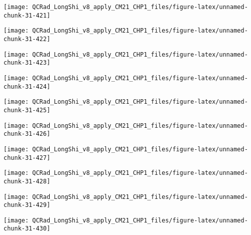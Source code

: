 \documentclass[
  10pt,
  a4paper,oneside]{article}
\begin{document}
\begin{center}\texttt{[image: QCRad\_LongShi\_v8\_apply\_CM21\_CHP1\_files/figure-latex/unnamed-chunk-31-421]} \end{center}

\begin{center}\texttt{[image: QCRad\_LongShi\_v8\_apply\_CM21\_CHP1\_files/figure-latex/unnamed-chunk-31-422]} \end{center}

\begin{center}\texttt{[image: QCRad\_LongShi\_v8\_apply\_CM21\_CHP1\_files/figure-latex/unnamed-chunk-31-423]} \end{center}

\begin{center}\texttt{[image: QCRad\_LongShi\_v8\_apply\_CM21\_CHP1\_files/figure-latex/unnamed-chunk-31-424]} \end{center}

\begin{center}\texttt{[image: QCRad\_LongShi\_v8\_apply\_CM21\_CHP1\_files/figure-latex/unnamed-chunk-31-425]} \end{center}

\begin{center}\texttt{[image: QCRad\_LongShi\_v8\_apply\_CM21\_CHP1\_files/figure-latex/unnamed-chunk-31-426]} \end{center}

\begin{center}\texttt{[image: QCRad\_LongShi\_v8\_apply\_CM21\_CHP1\_files/figure-latex/unnamed-chunk-31-427]} \end{center}

\begin{center}\texttt{[image: QCRad\_LongShi\_v8\_apply\_CM21\_CHP1\_files/figure-latex/unnamed-chunk-31-428]} \end{center}

\begin{center}\texttt{[image: QCRad\_LongShi\_v8\_apply\_CM21\_CHP1\_files/figure-latex/unnamed-chunk-31-429]} \end{center}

\begin{center}\texttt{[image: QCRad\_LongShi\_v8\_apply\_CM21\_CHP1\_files/figure-latex/unnamed-chunk-31-430]} \end{center}
\end{document}
